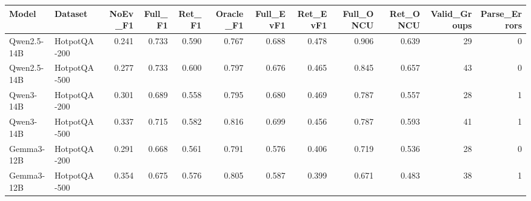 \begin{tabular}{llrrrrrrrrrr}
\toprule
Model & Dataset & NoEv_F1 & Full_F1 & Ret_F1 & Oracle_F1 & Full_EvF1 & Ret_EvF1 & Full_ONCU & Ret_ONCU & Valid_Groups & Parse_Errors \\
\midrule
Qwen2.5-14B & HotpotQA-200 & 0.241 & 0.733 & 0.590 & 0.767 & 0.688 & 0.478 & 0.906 & 0.639 & 29 & 0 \\
Qwen2.5-14B & HotpotQA-500 & 0.277 & 0.733 & 0.600 & 0.797 & 0.676 & 0.465 & 0.845 & 0.657 & 43 & 0 \\
Qwen3-14B & HotpotQA-200 & 0.301 & 0.689 & 0.558 & 0.795 & 0.680 & 0.469 & 0.787 & 0.557 & 28 & 1 \\
Qwen3-14B & HotpotQA-500 & 0.337 & 0.715 & 0.582 & 0.816 & 0.699 & 0.456 & 0.787 & 0.593 & 41 & 1 \\
Gemma3-12B & HotpotQA-200 & 0.291 & 0.668 & 0.561 & 0.791 & 0.576 & 0.406 & 0.719 & 0.536 & 28 & 0 \\
Gemma3-12B & HotpotQA-500 & 0.354 & 0.675 & 0.576 & 0.805 & 0.587 & 0.399 & 0.671 & 0.483 & 38 & 1 \\
\bottomrule
\end{tabular}
